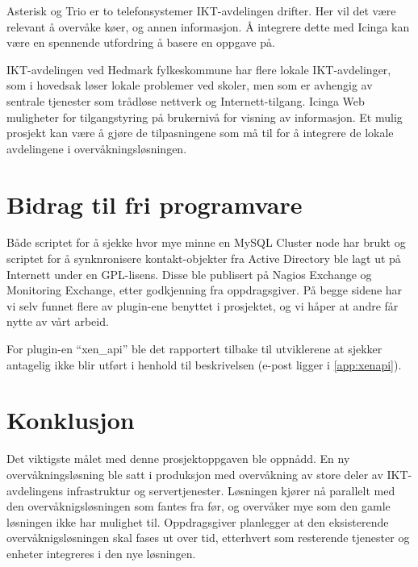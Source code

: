 Asterisk og Trio er to telefonsystemer IKT-avdelingen drifter. Her vil det være relevant å overvåke køer, og annen informasjon. Å integrere dette med Icinga kan være en spennende utfordring å basere en oppgave på.

IKT-avdelingen ved Hedmark fylkeskommune har flere lokale IKT-avdelinger, som i hovedsak løser lokale problemer ved skoler, men som er avhengig av sentrale tjenester som trådløse nettverk og Internett-tilgang. Icinga Web muligheter for tilgangstyring på brukernivå for visning av informasjon. Et mulig prosjekt kan være å gjøre de tilpasningene som må til for å integrere de lokale avdelingene i overvåkningsløsningen. 

\section{Bidrag til fri programvare}
Både scriptet for å sjekke hvor mye minne en MySQL Cluster node har brukt og scriptet for å synknronisere kontakt-objekter fra Active Directory ble lagt ut på Internett under en GPL-lisens. Disse ble publisert på Nagios Exchange\cite{monkeyexchange} og Monitoring Exchange\cite{monkeymonndb,monkeymonadsync}, etter godkjenning fra oppdragsgiver. På begge sidene har vi selv funnet flere av plugin-ene benyttet i prosjektet, og vi håper at andre får nytte av vårt arbeid.

For plugin-en ``xen\_api'' ble det rapportert tilbake til utviklerene at sjekker antagelig ikke blir utført i henhold til beskrivelsen (e-post ligger i \ref{app:xenapi}).

 
\section{Konklusjon}
Det viktigste målet med denne prosjektoppgaven ble oppnådd. En ny overvåkningsløsning ble satt i produksjon med overvåkning av store deler av IKT-avdelingens infrastruktur og servertjenester. Løsningen kjører nå parallelt med den overvåknigsløsningen som fantes fra før, og overvåker mye som den gamle løsningen ikke har mulighet til. Oppdragsgiver planlegger at den eksisterende overvåknigsløsningen skal fases ut over tid, etterhvert som resterende tjenester og enheter integreres i den nye løsningen.


